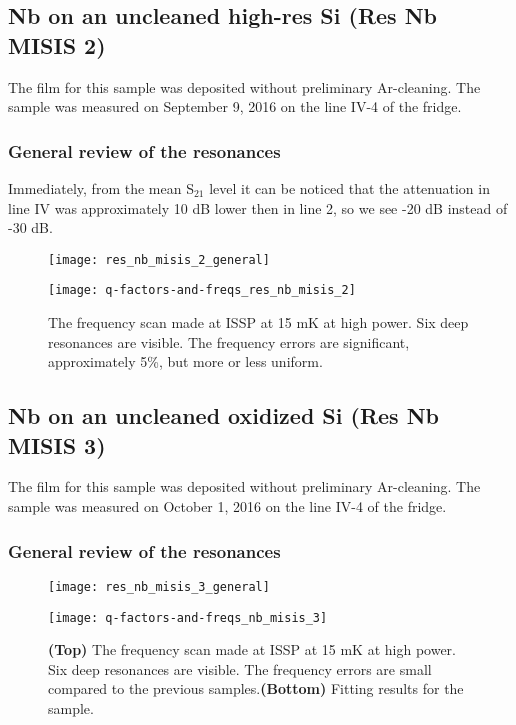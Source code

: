 \documentclass[12pt]{article}
\numberwithin{equation}{section}
\numberwithin{figure}{section}
\begin{document}
\newpage
\subsection{Nb on an uncleaned high-res Si (Res Nb MISIS 2)}

The film for this sample was deposited without preliminary Ar-cleaning. The sample was measured on September 9, 2016 on the line IV-4 of the fridge. 

\subsubsection{General review of the resonances}

Immediately, from the mean S$_{21}$ level it can be noticed that the attenuation in line IV was approximately 10 dB lower then in line 2, so we see -20 dB instead of -30 dB.

\begin{figure}[h!]
\centering
\texttt{[image: res\_nb\_misis\_2\_general]}

\vspace{0.5cm}
\texttt{[image: q-factors-and-freqs\_res\_nb\_misis\_2]}

\caption{The frequency scan made at ISSP at 15 mK at high power. Six deep resonances are visible. The frequency errors are significant, approximately 5\%, but more or less uniform.}
\end{figure}

\newpage
\subsection{Nb on an uncleaned oxidized Si (Res Nb MISIS 3)}

The film for this sample was deposited without preliminary Ar-cleaning. The sample was measured on October 1, 2016 on the line IV-4 of the fridge. 

\subsubsection{General review of the resonances}

\begin{figure}[h!]
\centering
\texttt{[image: res\_nb\_misis\_3\_general]}

\vspace{0.5cm}
\texttt{[image: q-factors-and-freqs\_nb\_misis\_3]}

\caption{\textbf{(Top)} The frequency scan made at ISSP at 15 mK at high power. Six deep resonances are visible. The frequency errors are small compared to the previous samples.\textbf{(Bottom)} Fitting results for the sample.}
\end{figure}
\end{document}
